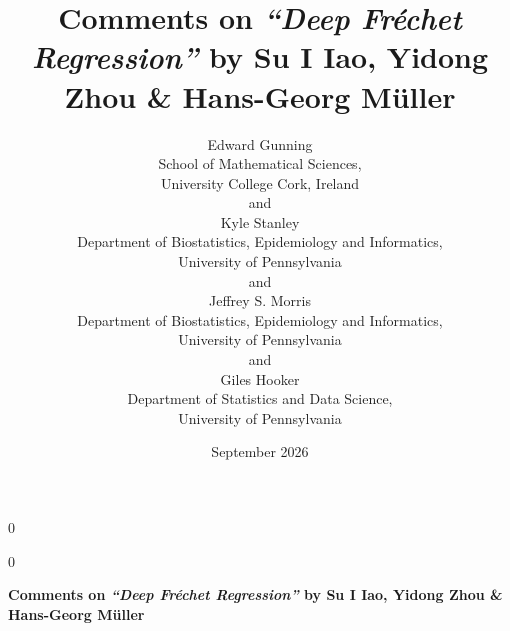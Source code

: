 \documentclass[12pt]{article}
\newcommand{\Frechet}{Fr\'echet\xspace}
\newcommand{\anon}{0}
\begin{document}
\def\spacingset#1{\renewcommand{\baselinestretch}{#1}\small\normalsize}
\spacingset{1}

\anon
{
  \title{\bf Comments on \emph{``Deep \Frechet Regression''} by Su I Iao, Yidong Zhou \& Hans-Georg Müller}
  \author{
    Edward Gunning\hspace{.2cm}\\
    School of Mathematical Sciences,\\ University College Cork, Ireland\\
    and\\
    Kyle Stanley\\
    Department of Biostatistics, Epidemiology and Informatics, \\University of Pennsylvania\\
    and\\
    Jeffrey S. Morris\\
    Department of Biostatistics, Epidemiology and Informatics,\\ University of Pennsylvania\\
    and\\
    Giles Hooker\\
    Department of Statistics and Data Science,\\ University of Pennsylvania}
  \date{September 2026}
  \maketitle
} \fi

\anon
{
  \bigskip
  \bigskip
  \bigskip
  \begin{center}
    {\LARGE \bf Comments on \emph{``Deep \Frechet Regression''} by Su I Iao, Yidong Zhou \& Hans-Georg Müller}
  \end{center}
  \medskip
} \fi

\bigskip


\vfill

\newpage
\spacingset{1.8}









\end{document}
